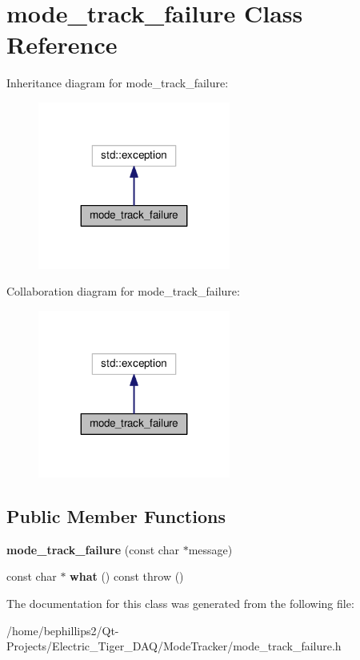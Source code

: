 \hypertarget{classmode__track__failure}{}\section{mode\+\_\+track\+\_\+failure Class Reference}
\label{classmode__track__failure}


Inheritance diagram for mode\+\_\+track\+\_\+failure\+:
\nopagebreak
\begin{figure}[H]
\begin{center}
\leavevmode
\includegraphics[width=179pt]{classmode__track__failure__inherit__graph}
\end{center}
\end{figure}


Collaboration diagram for mode\+\_\+track\+\_\+failure\+:
\nopagebreak
\begin{figure}[H]
\begin{center}
\leavevmode
\includegraphics[width=179pt]{classmode__track__failure__coll__graph}
\end{center}
\end{figure}
\subsection*{Public Member Functions}
\begin{DoxyCompactItemize}
\item 
{\bfseries mode\+\_\+track\+\_\+failure} (const char $\ast$message)\hypertarget{classmode__track__failure_a3636c3b5e513a98e420d7b769803fb07}{}\label{classmode__track__failure_a3636c3b5e513a98e420d7b769803fb07}

\item 
const char $\ast$ {\bfseries what} () const   throw ()\hypertarget{classmode__track__failure_a9a6a0afd0b4b1f675d5e3ab17313d937}{}\label{classmode__track__failure_a9a6a0afd0b4b1f675d5e3ab17313d937}

\end{DoxyCompactItemize}


The documentation for this class was generated from the following file\+:\begin{DoxyCompactItemize}
\item 
/home/bephillips2/\+Qt-\/\+Projects/\+Electric\+\_\+\+Tiger\+\_\+\+D\+A\+Q/\+Mode\+Tracker/mode\+\_\+track\+\_\+failure.\+h\end{DoxyCompactItemize}
